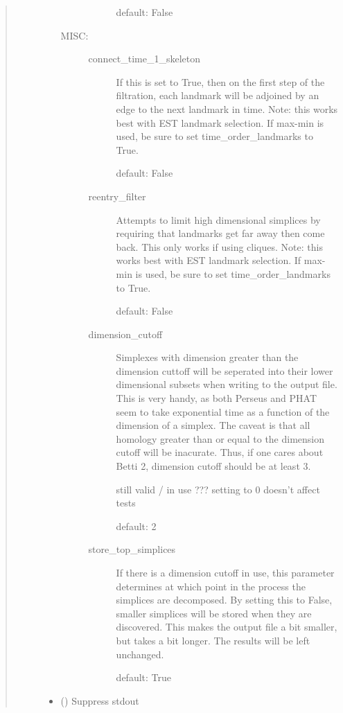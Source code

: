 \documentclass[letterpaper,10pt,openany,oneside,english]{sphinxmanual}
\begin{document}
\begin{fulllineitems}
\begin{quote}
\begin{description}
\begin{itemize}
\begin{description}
\begin{description}
default: False

\end{description}

\item[{MISC:}] \leavevmode\begin{description}
\item[{connect\_time\_1\_skeleton}] \leavevmode
If this is set to True, then on the first step of the
filtration, each landmark will be adjoined by an edge to the
next landmark in time. Note: this works best with EST
landmark selection. If max-min is used, be sure to set
time\_order\_landmarks to True.

default: False

\item[{reentry\_filter}] \leavevmode
Attempts to limit high dimensional simplices by requiring
that landmarks get far away then come back. This only works
if using cliques. Note: this works best with EST landmark
selection. If max-min is used, be sure to set
time\_order\_landmarks to True.

default: False

\item[{dimension\_cutoff}] \leavevmode
Simplexes with dimension greater than the dimension cuttoff
will be seperated into their lower dimensional subsets when
writing to the output file. This is very handy, as both
Perseus and PHAT seem to take exponential time as a function
of the dimension of a simplex. The caveat is that all
homology greater than or equal to the dimension cutoff will
be inacurate. Thus, if one cares about Betti 2, dimension
cutoff should be at least 3.

still valid / in use ??? setting to 0 doesn’t affect tests

default: 2

\item[{store\_top\_simplices}] \leavevmode
If there is a dimension cutoff in use, this parameter
determines at which point in the process the simplices are
decomposed. By setting this to False, smaller simplices will
be stored when they are discovered. This makes the output
file a bit smaller, but takes a bit longer. The results will
be left unchanged.

default: True

\end{description}

\end{description}


\item {} 
 () \textendash{} Suppress stdout


\end{itemize}
\end{description}
\end{quote}
\end{fulllineitems}
\end{document}
